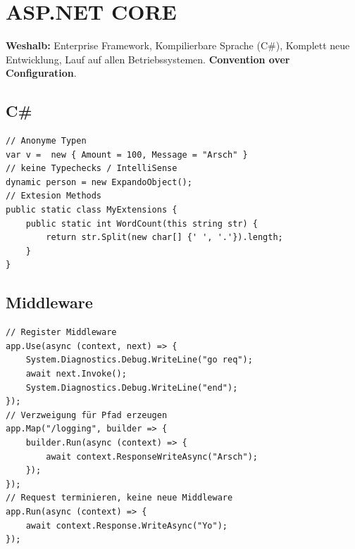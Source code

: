 
\section{ASP.NET CORE}
\textbf{Weshalb:} Enterprise Framework, Kompilierbare Sprache (C\#), Komplett neue Entwicklung, Lauf auf allen Betriebssystemen.
\textbf{Convention over Configuration}.

\subsection{C\#}
\begin{lstlisting}
// Anonyme Typen
var v =  new { Amount = 100, Message = "Arsch" }
// keine Typechecks / IntelliSense
dynamic person = new ExpandoObject();
// Extesion Methods
public static class MyExtensions {
    public static int WordCount(this string str) {
        return str.Split(new char[] {' ', '.'}).length;
    }
}
\end{lstlisting}

\subsection{Middleware}
\begin{lstlisting}
// Register Middleware
app.Use(async (context, next) => {
    System.Diagnostics.Debug.WriteLine("go req");
    await next.Invoke();
    System.Diagnostics.Debug.WriteLine("end");
});
// Verzweigung für Pfad erzeugen
app.Map("/logging", builder => {
    builder.Run(async (context) => {
        await context.ResponseWriteAsync("Arsch");
    });
});
// Request terminieren, keine neue Middleware
app.Run(async (context) => {
    await context.Response.WriteAsync("Yo");
});
\end{lstlisting}

